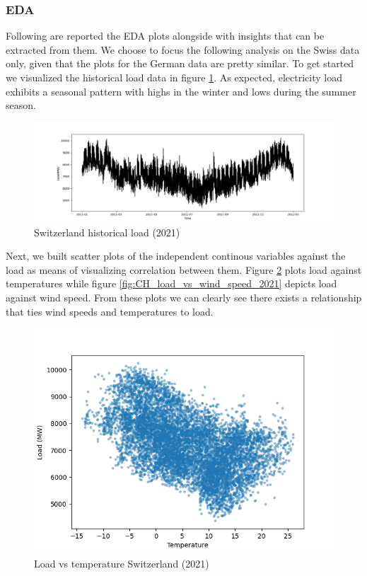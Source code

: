 \subsubsection{EDA}
Following are reported the EDA plots alongside with insights that can be extracted from them. We choose to focus the following analysis on the Swiss data only, given that the plots for the German data are pretty similar.
To get started we visualized the historical load data in figure \ref{fig:CH_historical_load_2021}. As expected, electricity load exhibits a seasonal pattern with highs in the winter and lows during the summer season.
\begin{figure}[!h]
    \includegraphics[width=\textwidth]{images/CH_historical_load_2021.png}
    \caption{Switzerland historical load (2021)}
    \label{fig:CH_historical_load_2021}
\end{figure}
Next, we built scatter plots of the independent continous variables against the load as means of visualizing correlation between them.
Figure \ref{fig:CH_load_vs_temperature_2021} plots load against temperatures while figure \ref{fig:CH_load_vs_wind_speed_2021} depicts load against wind speed. From these plots we can clearly see there exists a relationship that ties wind speeds and temperatures to load.

\begin{figure}[!h]
    \includegraphics[width=\textwidth]{images/CH_load_vs_temperature_2021.png}
    \caption{Load vs temperature Switzerland (2021)}
    \label{fig:CH_load_vs_temperature_2021}
\end{figure}

